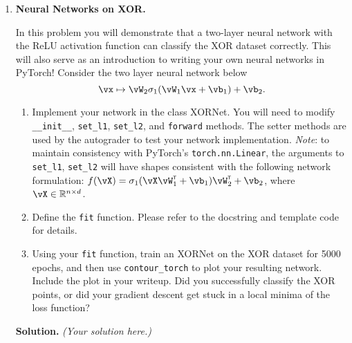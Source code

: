 \documentclass{article}
\newcommand\T{{\scriptscriptstyle\mathsf{T}}}
\theoremstyle{definition}
\theoremstyle{remark}
\newenvironment{Q}
        {%
            \clearpage
        \item
            }
        {%
            \phantom{s}
          \bigskip
          \textbf{Solution.}
        }
\begin{document}
\begin{enumerate}
                \begin{Q}
                    \textbf{Neural Networks on XOR.}

                    In this problem you will demonstrate that a two-layer
                    neural network with the ReLU activation function can
                    classify the XOR dataset correctly.  This will also serve
                    as an introduction to writing your own neural networks in
                    PyTorch!  Consider the two layer neural network below
                    \begin{equation*}
                        \vx \mapsto \vW_2 \sigma_1(\vW_1 \vx  + \vb_1)  + \vb_2.
                    \end{equation*}

                    \begin{enumerate}
                        \item Implement your network in the class XORNet.  You
                            will need to modify \texttt{\_\_init\_\_},
                            \texttt{set\_l1}, \texttt{set\_l2}, and
                            \texttt{forward} methods.  The setter methods are
                            used by the autograder to test your network
                            implementation.
                            \textit{Note}: to maintain consistency with
                            PyTorch's \texttt{torch.nn.Linear}, the arguments
                            to \texttt{set\_l1}, \texttt{set\_l2} will have
                            shapes consistent with the following network
                            formulation: $f(\vX) = \sigma_1(\vX\vW_1^\T +
                            \vb_1)\vW_2^\T + \vb_2$, where $\vX \in \mathbb{R}^{n \times d}$.
                        \item Define the \texttt{fit} function.  Please refer
                            to the docstring and template code for details.
                        \item Using your \texttt{fit} function, train an XORNet
                            on the XOR dataset for 5000 epochs, and then use
                            \texttt{contour\_torch} to plot your resulting
                            network.  Include the plot in your writeup.
                            Did you successfully classify the XOR points, or
                            did your gradient descent get stuck in a local
                            minima of the loss function?
                    \end{enumerate}
                \end{Q}
                \emph{(Your solution here.)}



\end{enumerate}
\end{document}
